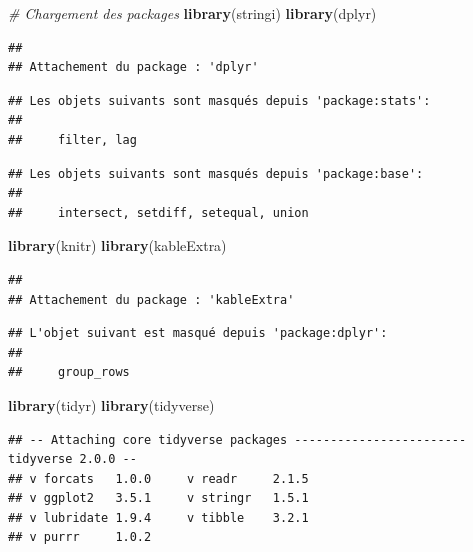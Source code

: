 \documentclass[
]{article}
\author{}
\date{\vspace{-2.5em}}
\newenvironment{Shaded}{\begin{snugshade}}{\end{snugshade}}
\newcommand{\CommentTok}[1]{\textcolor[rgb]{0.56,0.35,0.01}{\textit{#1}}}
\newcommand{\FunctionTok}[1]{\textcolor[rgb]{0.13,0.29,0.53}{\textbf{#1}}}
\newcommand{\NormalTok}[1]{#1}
\begin{document}
\begin{Shaded}
\begin{Highlighting}[]
\CommentTok{\# Chargement des packages}
\FunctionTok{library}\NormalTok{(stringi)}
\FunctionTok{library}\NormalTok{(dplyr)}
\end{Highlighting}
\end{Shaded}

\begin{verbatim}
## 
## Attachement du package : 'dplyr'
\end{verbatim}

\begin{verbatim}
## Les objets suivants sont masqués depuis 'package:stats':
## 
##     filter, lag
\end{verbatim}

\begin{verbatim}
## Les objets suivants sont masqués depuis 'package:base':
## 
##     intersect, setdiff, setequal, union
\end{verbatim}

\begin{Shaded}
\begin{Highlighting}[]
\FunctionTok{library}\NormalTok{(knitr)}
\FunctionTok{library}\NormalTok{(kableExtra)}
\end{Highlighting}
\end{Shaded}

\begin{verbatim}
## 
## Attachement du package : 'kableExtra'
\end{verbatim}

\begin{verbatim}
## L'objet suivant est masqué depuis 'package:dplyr':
## 
##     group_rows
\end{verbatim}

\begin{Shaded}
\begin{Highlighting}[]
\FunctionTok{library}\NormalTok{(tidyr)}
\FunctionTok{library}\NormalTok{(tidyverse)}
\end{Highlighting}
\end{Shaded}

\begin{verbatim}
## -- Attaching core tidyverse packages ------------------------ tidyverse 2.0.0 --
## v forcats   1.0.0     v readr     2.1.5
## v ggplot2   3.5.1     v stringr   1.5.1
## v lubridate 1.9.4     v tibble    3.2.1
## v purrr     1.0.2
\end{verbatim}
\end{document}
